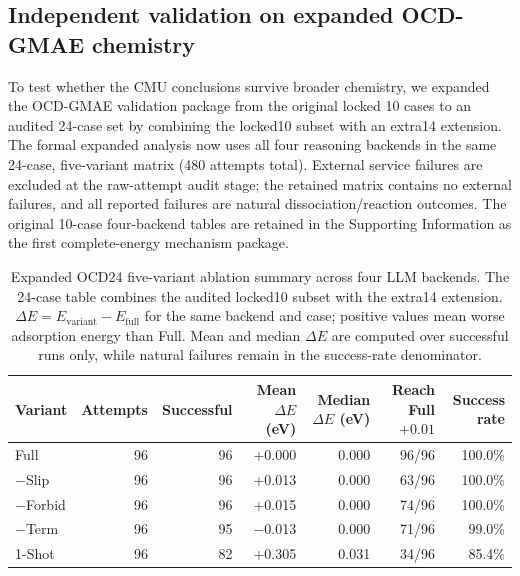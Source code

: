 \subsection{Independent validation on expanded OCD-GMAE chemistry}

To test whether the CMU conclusions survive broader chemistry, we expanded the OCD-GMAE validation package from the original locked 10 cases to an audited 24-case set by combining the locked10 subset with an extra14 extension.
The formal expanded analysis now uses all four reasoning backends in the same 24-case, five-variant matrix (480 attempts total).
External service failures are excluded at the raw-attempt audit stage; the retained matrix contains no external failures, and all reported failures are natural dissociation/reaction outcomes.
The original 10-case four-backend tables are retained in the Supporting Information as the first complete-energy mechanism package.

\begin{table}[t]
\centering
\scriptsize
\caption{Expanded OCD24 five-variant ablation summary across four LLM backends. The 24-case table combines the audited locked10 subset with the extra14 extension. $\Delta E = E_{\mathrm{variant}} - E_{\mathrm{full}}$ for the same backend and case; positive values mean worse adsorption energy than Full. Mean and median $\Delta E$ are computed over successful runs only, while natural failures remain in the success-rate denominator.}
\label{tab:ocd24-four-backend-summary}
\begin{tabular}{lrrrrrr}
\toprule
Variant & Attempts & Successful & Mean $\Delta E$ (eV) & Median $\Delta E$ (eV) & Reach Full$+0.01$ & Success rate \\
\midrule
Full & 96 & 96 & +0.000 & 0.000 & 96/96 & 100.0\% \\
$-$Slip & 96 & 96 & +0.013 & 0.000 & 63/96 & 100.0\% \\
$-$Forbid & 96 & 96 & +0.015 & 0.000 & 74/96 & 100.0\% \\
$-$Term & 96 & 95 & $-$0.013 & 0.000 & 71/96 & 99.0\% \\
1-Shot & 96 & 82 & +0.305 & 0.031 & 34/96 & 85.4\% \\
\bottomrule
\end{tabular}
\end{table}

